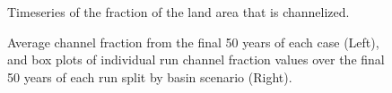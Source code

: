 \begin{figure}[!ht]
	\caption{Timeseries of the fraction of the land area that is channelized.}
	\label{fig:bd_chanfrac_timeseries}
\end{figure}

\begin{figure}[!ht]
	\caption{Average channel fraction from the final 50 years of each case (Left), and box plots of individual run channel fraction values over the final 50 years of each run split by basin scenario (Right).}
	\label{fig:bd_chanfrac_box}
\end{figure}

